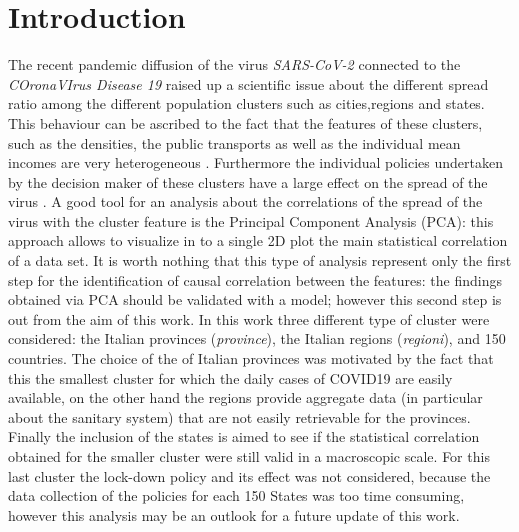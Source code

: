 \documentclass[
12pt, %
a4paper, %
oneside, %
headinclude,footinclude, %
BCOR5mm, %
]{scrartcl}
\begin{document}



\newpage %


\section{Introduction} \label{introduction}
The recent pandemic diffusion of the virus \textit{SARS-CoV-2} connected to the \textit{COronaVIrus Disease 19} raised up a scientific issue about the different spread ratio among the different population clusters such as cities,regions and states. This behaviour can be ascribed to the fact that the features of these clusters, such as the densities, the public transports as well as the individual mean incomes are very heterogeneous \cite{sebhatu2020explaining,skorka2020macroecology}. Furthermore the individual policies undertaken by the decision maker of these clusters have a large effect on the spread of the virus \cite{block2020social}. A good tool for an analysis about the correlations of the spread of the virus with the cluster feature is the Principal Component Analysis (PCA): this approach allows to visualize in to a single 2D plot the main statistical correlation of a data set. It is worth nothing that this type of analysis represent only the first step for the identification of causal correlation between the features: the findings obtained via PCA should be validated with a model; however this second step is out from the aim of this work. In this work three different type of cluster were considered: the Italian provinces (\textit{province}), the Italian regions (\textit{regioni}), and 150 countries. The choice of the of Italian provinces was motivated by the fact that this the smallest cluster for which the daily cases of COVID19 are easily available, on the other hand the regions provide aggregate data (in particular about the sanitary system) that are not easily retrievable for the provinces. Finally the inclusion of the states is aimed to see if the statistical correlation obtained for the smaller cluster were still valid in a macroscopic scale. For this last cluster the lock-down policy and its effect was not considered, because the data collection of the policies for each 150 States was too time consuming, however this analysis may be an outlook for a future update of this work. 
\end{document}
